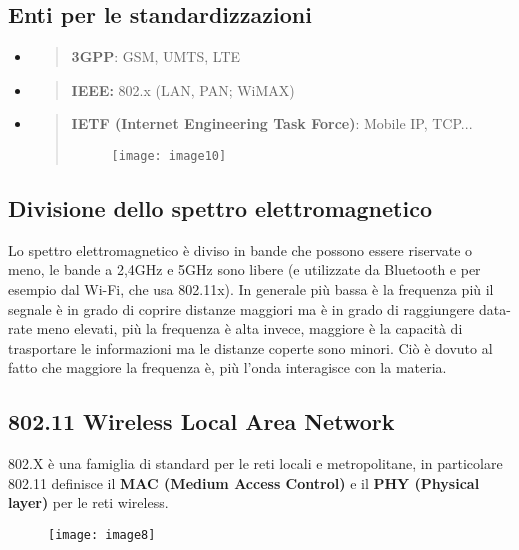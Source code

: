 \subsection{Enti per le
standardizzazioni}\label{enti-per-le-standardizzazioni}

\begin{itemize}
\item
  \begin{quote}
  \textbf{3GPP}: GSM, UMTS, LTE
  \end{quote}
\item
  \begin{quote}
  \textbf{IEEE:} 802.x (LAN, PAN; WiMAX)
  \end{quote}
\item
  \begin{quote}
  \textbf{IETF (Internet Engineering Task Force)}: Mobile IP,
  TCP...
  \begin{figure}[H]
    \centering
    \texttt{[image: image10]}
  \end{figure}
  \end{quote}
\end{itemize}

\subsection{Divisione dello spettro elettromagnetico}
Lo spettro elettromagnetico è diviso in bande che possono essere riservate o 
meno, le bande a 2,4GHz e 5GHz sono libere (e utilizzate da Bluetooth e per 
esempio dal Wi-Fi, che usa 802.11x). In generale più bassa è la frequenza più il 
segnale è in grado di coprire distanze maggiori ma è in grado di raggiungere 
data-rate meno elevati, più la frequenza è alta invece, maggiore è la capacità 
di trasportare le informazioni ma le distanze coperte sono minori. Ciò è dovuto 
al fatto che maggiore la frequenza è, più l'onda interagisce con la materia.

\subsection{802.11 Wireless Local Area
Network}\label{wireless-local-area-network}

802.X è una famiglia di standard per le reti locali e metropolitane, in
particolare 802.11 definisce il \textbf{MAC (Medium Access Control)} e
il \textbf{PHY (Physical layer)} per le reti wireless.

\begin{figure}[H]
  \centering
  \texttt{[image: image8]}
\end{figure}

